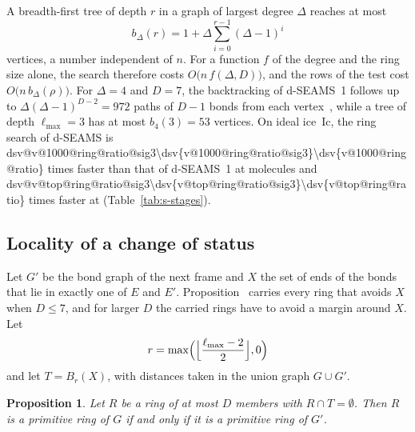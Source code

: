 \documentclass[preprint,12pt]{elsarticle}
\makeatletter
\newtheorem{proposition}{Proposition}
\newcommand{\rthree}[1]{\ifcsname dsv@#1@sig3\endcsname\num{\dsv{#1@sig3}}\else\num[round-mode=figures,round-precision=3]{\dsv{#1}}\fi}
\makeatother
\begin{document}
A breadth-first tree of depth $r$ in a graph of largest degree $\Delta$ reaches at most
\begin{equation}
  b_\Delta(r)=1+\Delta\sum_{i=0}^{r-1}(\Delta-1)^{i}
  \label{eq:s-ball}
\end{equation}
vertices, a number independent of $n$.
For a function $f$ of the degree and the ring size alone, the search therefore costs $O\bigl(n\,f(\Delta,D)\bigr)$, and the rows of the test cost $O\bigl(n\,b_\Delta(\rho)\bigr)$.
For $\Delta=4$ and $D=7$, the backtracking of d-SEAMS~1 follows up to $\Delta(\Delta-1)^{D-2}=972$ paths of $D-1$ bonds from each vertex~\cite{goswami2020dseams}, while a tree of depth $\ell_{\max}=3$ has at most $b_4(3)=53$ vertices.
On ideal ice~Ic, the ring search of d-SEAMS is \rthree{v@1000@ring@ratio} times faster than that of d-SEAMS~1 at  molecules and \rthree{v@top@ring@ratio} times faster at  (Table~\ref{tab:s-stages}).

\subsection{Locality of a change of status}
\label{sec:s-locality}

Let $G'$ be the bond graph of the next frame and $X$ the set of ends of the bonds that lie in exactly one of $E$ and $E'$.
Proposition~ carries every ring that avoids $X$ when $D\le 7$, and for larger $D$ the carried rings have to avoid a margin around $X$.
Let
\begin{equation}
  r=\max\Bigl(\Bigl\lfloor\frac{\ell_{\max}-2}{2}\Bigr\rfloor,0\Bigr)
  \label{eq:s-radius}
\end{equation}
and let $T=B_r(X)$, with distances taken in the union graph $G\cup G'$.

\begin{proposition}
\label{prop:s-locality} Let $R$ be a ring of at most $D$ members with $R\cap T=\emptyset$.
Then $R$ is a primitive ring of $G$ if and only if it is a primitive ring of $G'$.
\end{proposition}
\end{document}
